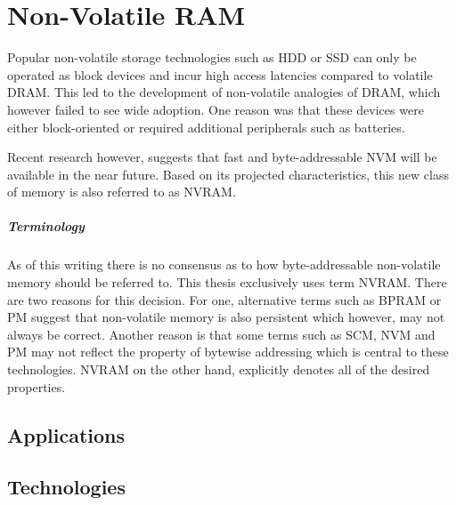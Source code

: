 \chapter{Non-Volatile RAM}
\label{ch:nvram}

Popular non-volatile storage technologies such as HDD or SSD can only be
operated as block devices and incur high access latencies compared to volatile
DRAM. This led to the development of non-volatile analogies of DRAM, which
however failed to see wide adoption. One reason was that these devices were
either block-oriented or required additional peripherals such as batteries.

Recent research however, suggests that fast and byte-addressable NVM will be
available in the near future. Based on its projected characteristics, this new
class of memory is also referred to as NVRAM.


\paragraph{Terminology}

As of this writing there is no consensus as to how byte-addressable non-volatile
memory should be referred to. This thesis exclusively uses term NVRAM. There are
two reasons for this decision. For one, alternative terms such as BPRAM or PM
suggest that non-volatile memory is also persistent which however, may not
always be correct. Another reason is that some terms such as SCM,
NVM and PM may not reflect the property of bytewise addressing which is central
to these technologies. NVRAM on the other hand, explicitly denotes all of the
desired properties.

\section{Applications}


\section{Technologies}

